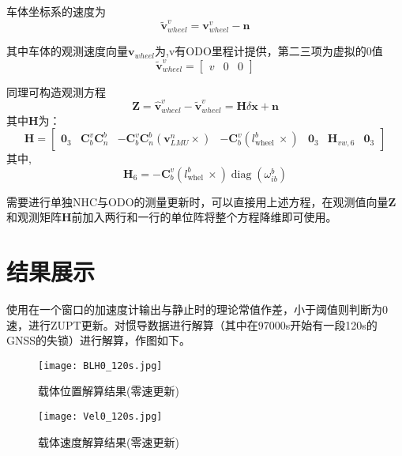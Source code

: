 \documentclass[codepkg=listings,theme=fancy]{course-report}
\begin{document}
车体坐标系的速度为
\begin{equation}
\tilde{\bm{v}}^v_{wheel}=\bm{v}^v_{wheel}-\bm{n}
\end{equation}

其中车体的观测速度向量$\bm{v}_{wheel}$为,v有ODO里程计提供，第二三项为虚拟的0值
\begin{equation}
\tilde{\bm{v}}^v_{wheel}=\begin{bmatrix}
v&0&0
\end{bmatrix}
\end{equation}

同理可构造观测方程
\begin{equation}
\bm{Z}=\hat{\boldsymbol{v}}^v_{wheel}-\tilde{\bm{v}}^v_{wheel}=\bm{H}\delta \boldsymbol{x}+\bm{n}
\end{equation}
其中$\bm{H}$为：
\begin{equation}
\mathbf{H}=\left[\begin{array}{lllllll}
\mathbf{0}_{3} & \mathbf{C}_{b}^{v} \mathbf{C}_{n}^{b} & -\mathbf{C}_{b}^{v} \mathbf{C}_{n}^{b}\left(\boldsymbol{v}_{L M U}^{n} \times\right) & -\mathbf{C}_{b}^{v}\left(l_{\text {wheel }}^{b} \times\right) & \mathbf{0}_{3} & \mathbf{H}_{v w, 6} & \mathbf{0}_{3}
\end{array}\right]
\end{equation}
其中,
\begin{equation}
\mathbf{H}_{ 6}=-\mathbf{C}_{b}^{v}\left(l_{\text {whel }}^{b} \times\right) \operatorname{diag}\left(\omega_{i b}^{b}\right)
\end{equation}

需要进行单独NHC与ODO的测量更新时，可以直接用上述方程，在观测值向量$\bm{Z}$和观测矩阵$\bm{H}$前加入两行和一行的单位阵将整个方程降维即可使用。

\section{结果展示}
使用在一个窗口的加速度计输出与静止时的理论常值作差，小于阈值则判断为0速，进行ZUPT更新。对惯导数据进行解算（其中在97000s开始有一段120s的GNSS的失锁）进行解算，作图如下。
\begin{figure}[H]
\texttt{[image: BLH0\_120s.jpg]}
\caption{载体位置解算结果(零速更新)}
\end{figure}

\begin{figure}[H]
\texttt{[image: Vel0\_120s.jpg]}
\caption{载体速度解算结果(零速更新)}
\end{figure}
\end{document}
